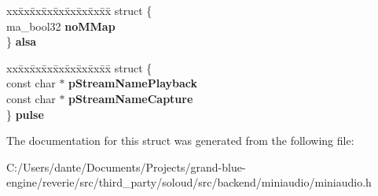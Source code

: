 \begin{DoxyCompactItemize}
\begin{tabbing}
\end{tabbing}\item 
\mbox{\label{structma__device__config_a551af13aeb4057b6280a55d0c4f6afff}} 
\begin{tabbing}
xx\=xx\=xx\=xx\=xx\=xx\=xx\=xx\=xx\=\kill
struct \{\\
\>ma\_bool32 {\bfseries noMMap}\\
\} {\bfseries alsa}\\

\end{tabbing}\item 
\mbox{\label{structma__device__config_acbc7353c92ae35da1587e9433fbdc6a4}} 
\begin{tabbing}
xx\=xx\=xx\=xx\=xx\=xx\=xx\=xx\=xx\=\kill
struct \{\\
\>const char $\ast$ {\bfseries pStreamNamePlayback}\\
\>const char $\ast$ {\bfseries pStreamNameCapture}\\
\} {\bfseries pulse}\\

\end{tabbing}\end{DoxyCompactItemize}


The documentation for this struct was generated from the following file\+:\begin{DoxyCompactItemize}
\item 
C\+:/\+Users/dante/\+Documents/\+Projects/grand-\/blue-\/engine/reverie/src/third\+\_\+party/soloud/src/backend/miniaudio/miniaudio.\+h\end{DoxyCompactItemize}
